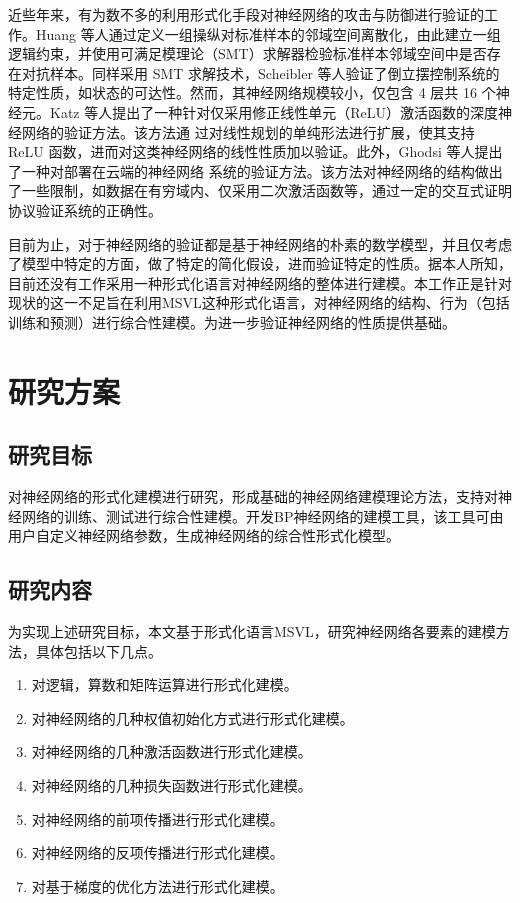 近些年来，有为数不多的利用形式化手段对神经网络的攻击与防御进行验证的工作。Huang 等人通过定义一组操纵对标准样本的邻域空间离散化，由此建立一组逻辑约束，并使用可满足模理论（SMT）求解器检验标准样本邻域空间中是否存在对抗样本。同样采用 SMT 求解技术，Scheibler 等人验证了倒立摆控制系统的特定性质，如状态的可达性。然而，其神经网络规模较小，仅包含 4 层共 16 个神经元。Katz 等人提出了一种针对仅采用修正线性单元（ReLU）激活函数的深度神经网络的验证方法。该方法通
过对线性规划的单纯形法进行扩展，使其支持 ReLU 函数，进而对这类神经网络的线性性质加以验证。此外，Ghodsi 等人提出了一种对部署在云端的神经网络
系统的验证方法。该方法对神经网络的结构做出了一些限制，如数据在有穷域内、仅采用二次激活函数等，通过一定的交互式证明协议验证系统的正确性。%

目前为止，对于神经网络的验证都是基于神经网络的朴素的数学模型，并且仅考虑了模型中特定的方面，做了特定的简化假设，进而验证特定的性质。据本人所知，目前还没有工作采用一种形式化语言对神经网络的整体进行建模。本工作正是针对现状的这一不足旨在利用MSVL这种形式化语言，对神经网络的结构、行为（包括训练和预测）进行综合性建模。为进一步验证神经网络的性质提供基础。





\section{研究方案}

\subsection{研究目标}
对神经网络的形式化建模进行研究，形成基础的神经网络建模理论方法，支持对神经网络的训练、测试进行综合性建模。开发BP神经网络的建模工具，该工具可由用户自定义神经网络参数，生成神经网络的综合性形式化模型。

\subsection{研究内容}
为实现上述研究目标，本文基于形式化语言MSVL，研究神经网络各要素的建模方法，具体包括以下几点。
\begin{enumerate}[(1)]
  \item 对逻辑，算数和矩阵运算进行形式化建模。
  \item 对神经网络的几种权值初始化方式进行形式化建模。
  \item 对神经网络的几种激活函数进行形式化建模。
  \item 对神经网络的几种损失函数进行形式化建模。
  \item 对神经网络的前项传播进行形式化建模。
  \item 对神经网络的反项传播进行形式化建模。
  \item 对基于梯度的优化方法进行形式化建模。
\end{enumerate}

